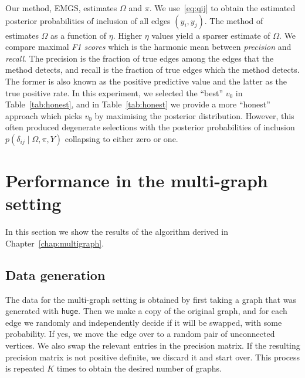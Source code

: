 \documentclass[a4paper, 11pt, oneside]{report}
\newcommand{\1}{\mathds{1}}
\begin{document}
Our method, EMGS, estimates $\Omega$ and $\pi$. We use~\eqref{eq:qij} to obtain the estimated posterior probabilities of inclusion of all edges
$(y_i, y_j)$. The method of~\citet{mein2006} estimates $\Omega$ as a function of
$\eta$. Higher $\eta$ values yield a sparser estimate of $\Omega$.
We compare maximal \emph{F1 scores} which is the harmonic mean between \emph{precision}
and \emph{recall}. The precision is the fraction of true edges
among the edges that the method detects, and recall is the fraction
of true edges which the method detects. The former is also known as the
positive predictive value and the latter as the true positive rate.
In this experiment, we selected the ``best'' $v_0$ in Table~\ref{tab:honest}, and in
Table~\ref{tab:honest} we provide a more ``honest'' approach which picks $v_0$ by
maximising the posterior distribution.
However, this often produced degenerate selections with the posterior
probabilities of inclusion $p(\delta_{ij} \mid \Omega, \pi, Y)$ collapsing to
either zero or one. 

\section{Performance in the multi-graph setting}
In this section we show the results of the algorithm derived in Chapter~\ref{chap:multigraph}.

\subsection{Data generation}\label{ssect:data-generation}
The data for the multi-graph setting is obtained by first taking a graph
that was generated with \texttt{huge}.
Then we make a copy of the original graph,
and for each edge we randomly and independently decide if it will be swapped, with some probability.
If yes, we move the edge over to a random pair of unconnected vertices.
We also swap the relevant entries in the precision matrix.
If the resulting precision matrix is not positive definite, we discard it and start over.
This process is repeated $K$ times to obtain the desired number of graphs.
\end{document}
